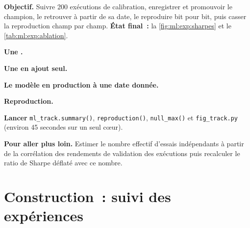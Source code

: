 \begin{tutorial}
\textbf{Objectif.} Suivre 200 exécutions de calibration, enregistrer et promouvoir le champion, le retrouver à partir de sa date, le reproduire bit pour bit, puis casser
la reproduction champ par champ. \textbf{État final~:} la \cref{fig:ml:exp:sharpes} et le \cref{tab:ml:exp:ablation}.
\begin{tutsteps}
\item \textbf{Une .}
\label{lst:ml:exp:run}
\item \textbf{Une  en ajout seul.}
\label{lst:ml:exp:audit}
\item \textbf{Le modèle en production à une date donnée.}
\label{lst:ml:exp:asof}
\item \textbf{Reproduction.}
\label{lst:ml:exp:repro}
\item \textbf{Lancer} \texttt{ml\_track.summary()}, \texttt{reproduction()}, \texttt{null\_max()} et \texttt{fig\_track.py}
(environ 45 secondes sur un seul cœur).
\end{tutsteps}
\textbf{Pour aller plus loin.} Estimer le nombre effectif d'essais indépendants à partir de la corrélation des rendements de validation des exécutions
puis recalculer le ratio de Sharpe déflaté avec ce nombre.
\end{tutorial}

\section{Construction~: suivi des expériences}\label{bld:ml:experiment-tracking-and-reproducibility:exptrack}

